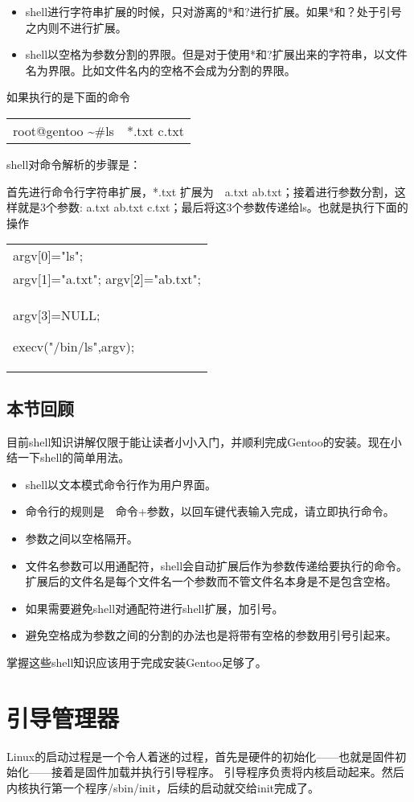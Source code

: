 \documentclass[amstex,twoside]{ctexbook}
\newenvironment{code}{\small\tt\begin{longtable}{p{0.8\textwidth}}}{\end{longtable}}
\begin{document}
\begin{itemize}
\item shell进行字符串扩展的时候，只对游离的*和?进行扩展。如果*和？处于引号之内则不进行扩展。
\item shell以空格为参数分割的界限。但是对于使用*和?扩展出来的字符串，以文件名为界限。比如文件名内的空格不会成为分割的界限。
\end{itemize}


如果执行的是下面的命令
\begin{code}
root@gentoo \textasciitilde \#ls　*.txt c.txt
\end{code}

shell对命令解析的步骤是：

首先进行命令行字符串扩展，*.txt 扩展为　a.txt ab.txt；接着进行参数分割，这样就是3个参数: a.txt ab.txt c.txt；最后将这3个参数传递给ls。也就是执行下面的操作

\begin{code}
argv[0]="ls";\\
argv[1]="a.txt";
argv[2]="ab.txt";\\
argv[3]=NULL;

execv("/bin/ls",argv);
\end{code}

\subsection*{本节回顾}

目前shell知识讲解仅限于能让读者小小入门，并顺利完成Gentoo的安装。现在小结一下shell的简单用法。

\begin{itemize}
\item shell以文本模式命令行作为用户界面。
\item 命令行的规则是　命令+参数，以回车键代表输入完成，请立即执行命令。
\item 参数之间以空格隔开。
\item 文件名参数可以用通配符，shell会自动扩展后作为参数传递给要执行的命令。扩展后的文件名是每个文件名一个参数而不管文件名本身是不是包含空格。
\item 如果需要避免shell对通配符进行shell扩展，加引号。
\item 避免空格成为参数之间的分割的办法也是将带有空格的参数用引号引起来。
\end{itemize}

掌握这些shell知识应该用于完成安装Gentoo足够了。


\section{引导管理器}
Linux的启动过程是一个令人着迷的过程，首先是硬件的初始化——也就是固件初始化——接着是固件加载并执行引导程序。
引导程序负责将内核启动起来。然后内核执行第一个程序/sbin/init，后续的启动就交给init完成了。
\end{document}
